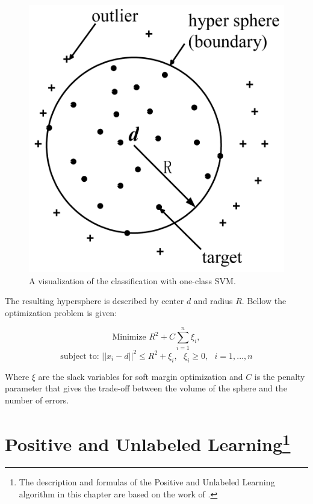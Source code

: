 \begin{figure}[h!]
    \centering
    \includegraphics[scale=0.2]{Graphics/tax-duin-svm.png}
    \caption{A visualization of the classification with one-class SVM.}
    \label{fig:hypersphere}
\end{figure}

The resulting hypersphere is described by center \(d\) and radius
\(R\). Bellow the optimization problem is given: 

\[ \textrm{Minimize } R^2 + C \sum_{i=1}^{n} \xi_i, \]
\[ \textrm{subject to: } || x_i - d ||^2 \leq R^2 + \xi_i, \textrm{ } \xi_i \geq 0, \textrm{ } i = 1, ..., n \]

Where \( \xi \) are the slack variables for soft margin optimization and \( C \)  is the penalty parameter that gives the trade-off between the volume of the sphere and the number of errors.

\section[Positive and Unlabeled Learning]{Positive and Unlabeled Learning\footnote{The description and formulas of the Positive and Unlabeled Learning algorithm in this chapter are based on the work of \cite{Elkan;Noto:2008}.}}\label{Chapter:PUL}

